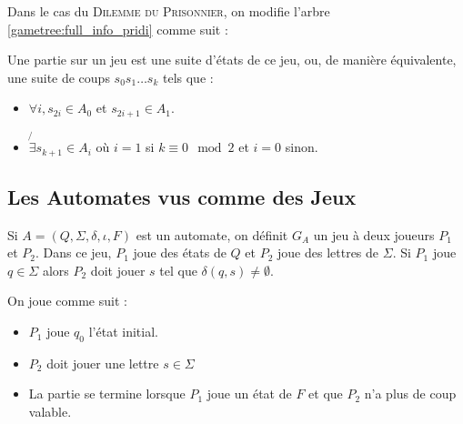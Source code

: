 \documentclass{cours}
\begin{document}
Dans le cas du \textsc{Dilemme du Prisonnier}, on modifie l'arbre \ref{gametree:full_info_pridi} comme suit :
\begin{center}
\end{center}
\begin{definition}
    Une partie sur un jeu est une suite d'états de ce jeu, ou, de manière équivalente, une suite de coups $s_{0}s_{1}\ldots s_{k}$ tels que : 
    \begin{itemize}
        \item $\forall i, s_{2i} \in A_{0}$ et $s_{2i + 1} \in A_{1}$.
        \item $\not{\exists} s_{k + 1} \in A_{i}$ où $i = 1$ si $k \equiv 0 \mod 2$ et $i = 0$ sinon.
    \end{itemize}
\end{definition}

\subsection{Les Automates vus comme des Jeux}
\begin{definition}
    Si $A = \left(Q, \Sigma, \delta, \iota, F\right)$ est un automate, on définit $G_{A}$ un jeu à deux joueurs $P_{1}$ et $P_{2}$. Dans ce jeu, $P_{1}$ joue des états de $Q$ et $P_{2}$ joue des lettres de $\Sigma$. Si $P_{1}$ joue $q \in \Sigma$ alors $P_{2}$ doit jouer $s$ tel que $\delta(q, s) \neq \emptyset$.
\end{definition}
On joue comme suit :
\begin{itemize}
    \item $P_{1}$ joue $q_{0}$ l'état initial.
    \item $P_{2}$ doit jouer une lettre $s \in \Sigma$
    \item La partie se termine lorsque $P_{1}$ joue un état de $F$ et que $P_{2}$ n'a plus de coup valable.
\end{itemize}
\end{document}
